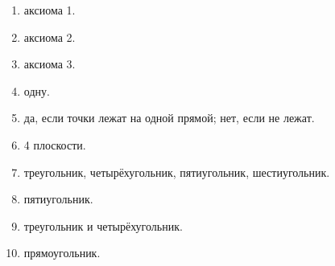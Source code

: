 \documentclass{umk-matematika}
\begin{document}
\begin{enumerate}
  \item аксиома 1.
  \item аксиома 2.
  \item аксиома 3.
  \item одну.
  \item да, если точки лежат на одной прямой; нет, если не лежат.
  \item 4 плоскости.
  \item треугольник, четырёхугольник, пятиугольник, шестиугольник.
  \item пятиугольник.
  \item треугольник и четырёхугольник.
  \item прямоугольник.
\end{enumerate}
\end{document}

